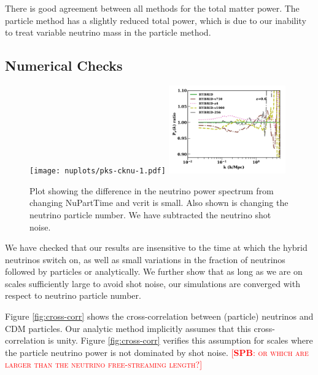 \documentclass[useAMS, usenatbib]{mnras}
\newcommand{\spb}[1]{{\textsc{\textcolor{red}{[{\bf SPB}: #1]}}}}
\begin{document}
There is good agreement between all methods for the total matter power.
The particle method has a slightly reduced total power, which is due to our inability to
treat variable neutrino mass in the particle method.

\subsection{Numerical Checks}

\begin{figure}
  \texttt{[image: nuplots/pks-cknu-1.pdf]}
  \includegraphics[width=0.45\textwidth]{nuplots/pks_nu_ckrel-1.pdf}
  \caption{Plot showing the difference in the neutrino power spectrum from changing NuPartTime and vcrit is small. Also shown is changing the neutrino particle number. We have subtracted the neutrino shot noise.}
  \label{fig:vcrit}
\end{figure}

%
We have checked that our results are insensitive to the time at which the hybrid neutrinos switch on,
as well as small variations in the fraction of neutrinos followed by particles or analytically. We further show that as long as we are on scales sufficiently large to avoid shot noise, our simulations are converged with respect to neutrino particle number.

Figure \ref{fig:cross-corr} shows the cross-correlation between (particle) neutrinos and CDM particles. Our analytic method implicitly assumes that this cross-correlation is unity. Figure \ref{fig:cross-corr} verifies this assumption for scales where the particle neutrino power is not dominated by shot noise. \spb{or which are larger than the neutrino free-streaming length?}
\end{document}
